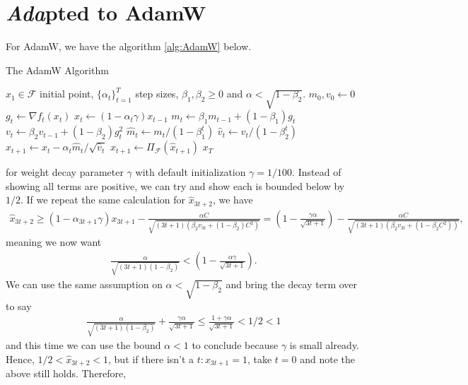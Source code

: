 \documentclass{article}
\newcommand{\1}{\mathbf{1}}                 %
\newcommand{\calF}{\mathcal{F}}
\begin{document}
\section*{\textit{Ada}pted to AdamW}
For AdamW, we have the algorithm \ref{alg:AdamW} below. 
\begin{algorithm}
    \caption{The AdamW Algorithm}\label{alg:AdamW}
\begin{algorithmic}
    \Require \(x_1\in\calF\) initial point, \(\{\alpha_t\}_{t=1}^T\) step sizes, \(\beta_1,\beta_2\geq 0\) and \(\alpha<\sqrt{1-\beta_2}\).  
    \State $m_0,v_0  \gets 0$ 
        \State \(g_t\gets \nabla f_t(x_t)\) 
        \State \(x_t \gets (1-\alpha_t\gamma)x_{t-1}\)
        \State \(m_t \gets \beta_1 m_{t-1} + (1-\beta_1)g_t \) 
        \State \(v_t \gets \beta_2 v_{t-1} + (1-\beta_2)g_t^2 \)
        \State \(\hat{m}_t \gets m_t/(1-\beta_1^t) \) 
        \State \(\hat{v}_t \gets v_t/(1-\beta_2^t)\) 
        \State \(\hat{x}_{t+1} \gets x_t - \alpha_t \hat{m}_t/\sqrt{\hat{v}_t }\)
        \State \(x_{t+1} \gets \Pi_\calF(\hat{x}_{t+1})\)
    \EndFor
    \State \Return \(x_T\)
\end{algorithmic}
\end{algorithm}
for weight decay parameter \(\gamma\) with default initialization \(\gamma = 1/100\). Instead of showing all terms are positive, we can try and show each is bounded below by \(1/2\). If we repeat the same calculation for \(\hat{x}_{3t+2}\), we have 
\begin{align*}
    \hat{x}_{3t+2} \geq \left(1-\alpha_{3t+1}\gamma\right)x_{3t+1} - \frac{\alpha C}{\sqrt{(3t+1)(\beta_2 v_{3t} + (1-\beta_2)C^2)}} =  \left(1- \frac{\gamma\alpha}{\sqrt{3t+1}}\right) -  \frac{\alpha C}{\sqrt{(3t+1)(\beta_2 v_{3t}+(1-\beta_2 C^2))}},
\end{align*}
meaning we now want 
\begin{align*}
    \frac{\alpha}{\sqrt{(3t+1)(1-\beta_2)}} < \left(1- \frac{\alpha\gamma}{\sqrt{3t+1}}\right).
\end{align*}
We can use the same assumption on \(\alpha<\sqrt{1-\beta_2}\) and bring the decay term over to say 
\begin{align*}
    \frac{\alpha}{\sqrt{(3t+1)(1-\beta_2)}} + \frac{\gamma\alpha}{\sqrt{3t+1}} \leq \frac{1 + \gamma\alpha}{\sqrt{3t+1}} < 1/2 < 1
\end{align*}
and this time we can use the bound \(\alpha<1\) to conclude because \(\gamma\) is small already. Hence, \(1/2<\hat{x}_{3t+2}<1\), but if there isn't a \(t:x_{3t+1}=1\), take \(t=0\) and note the above still holds. Therefore,  
\end{document}
